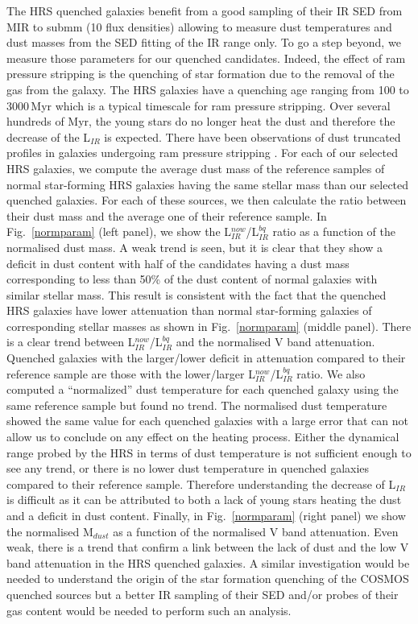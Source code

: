 \documentclass[traditabstract]{aa} %
\begin{document}
The HRS quenched galaxies benefit from a good sampling of their IR SED from MIR to submm (10 flux densities) allowing to measure dust temperatures and dust masses from the SED fitting of the IR range only.
To go a step beyond, we measure those parameters for our quenched candidates. 
Indeed, the effect of ram pressure stripping is the quenching of star formation due to the removal of the gas from the galaxy. 
The HRS galaxies have a quenching age ranging from 100 to 3000\,Myr which is a typical timescale for ram pressure stripping. 
Over several hundreds of Myr, the young stars do no longer heat the dust and therefore the decrease of the L$_{IR}$ is expected. 
There have been observations of dust truncated profiles in galaxies undergoing ram pressure stripping \citep[e.g.,][]{BoselliGavazzi06,Cortese10a,Cortese14,Longobardi20}.
For each of our selected HRS galaxies, we compute the average dust mass of the reference samples of normal star-forming HRS galaxies having the same stellar mass than our selected quenched galaxies.
For each of these sources, we then calculate the ratio between their dust mass and the average one of their reference sample.
In Fig.~\ref{normparam} (left panel), we show the L$_{IR}^{now}$/L$_{IR}^{bq}$ ratio as a function of the normalised dust mass.
A weak trend is seen, but it is clear that they show a deficit in dust content with half of the candidates having a dust mass corresponding to less than 50\% of the dust content of normal galaxies with similar stellar mass.
This result is consistent with the fact that the quenched HRS galaxies have lower attenuation than normal star-forming galaxies of corresponding stellar masses as shown in Fig.~\ref{normparam} (middle panel).
There is a clear trend between L$_{IR}^{now}$/L$_{IR}^{bq}$ and the normalised V band attenuation.
Quenched galaxies with the larger/lower deficit in attenuation compared to their reference sample are those with the lower/larger L$_{IR}^{now}$/L$_{IR}^{bq}$ ratio.
We also computed a ``normalized'' dust temperature for each quenched galaxy using the same reference sample but found no trend.
The normalised dust temperature showed the same value for each quenched galaxies with a large error that can not allow us to conclude on any effect on the heating process.
Either the dynamical range probed by the HRS in terms of dust temperature is not sufficient enough to see any trend, or there is no lower dust temperature in quenched galaxies compared to their reference sample.
Therefore understanding the decrease of L$_{IR}$ is difficult as it can be attributed to both a lack of young stars heating the dust and a deficit in dust content.
Finally, in Fig.~\ref{normparam} (right panel) we show the normalised M$_{dust}$ as a function of the normalised V band attenuation.
Even weak, there is a trend that confirm a link between the lack of dust and the low V band attenuation in the HRS quenched galaxies.
A similar investigation would be needed to understand the origin of the star formation quenching of the COSMOS quenched sources but a better IR sampling of their SED  and/or probes of their gas content  would be needed to perform such an analysis. 
\end{document}
